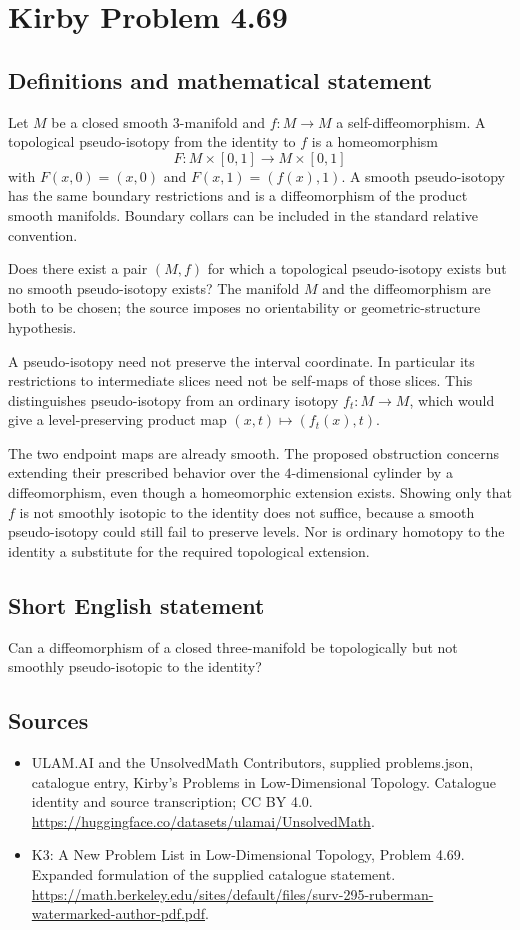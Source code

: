 \documentclass[11pt,a4paper]{article}
\begin{document}
\section*{Kirby Problem 4.69}\label{statement}

\subsection{Definitions and mathematical statement}
Let $M$ be a closed smooth $3$-manifold and $f:M\to M$ a
self-diffeomorphism. A topological pseudo-isotopy from the identity
to $f$ is a homeomorphism
\[
 F:M\times[0,1]\longrightarrow M\times[0,1]
\]
with $F(x,0)=(x,0)$ and $F(x,1)=(f(x),1)$.
A smooth pseudo-isotopy has the same boundary restrictions and is
a diffeomorphism of the product smooth manifolds. Boundary collars
can be included in the standard relative convention.

Does there exist a pair $(M,f)$ for which a topological
pseudo-isotopy exists but no smooth pseudo-isotopy exists? The
manifold $M$ and the diffeomorphism are both to be chosen; the
source imposes no orientability or geometric-structure hypothesis.

A pseudo-isotopy need not preserve the interval coordinate. In
particular its restrictions to intermediate slices need not be
self-maps of those slices. This distinguishes pseudo-isotopy from an
ordinary isotopy $f_t:M\to M$, which would give a level-preserving
product map $(x,t)\mapsto(f_t(x),t)$.

The two endpoint maps are already smooth. The proposed obstruction
concerns extending their prescribed behavior over the $4$-dimensional
cylinder by a diffeomorphism, even though a homeomorphic extension
exists. Showing only that $f$ is not smoothly isotopic to the
identity does not suffice, because a smooth pseudo-isotopy could
still fail to preserve levels. Nor is ordinary homotopy to the
identity a substitute for the required topological extension.
\subsection{Short English statement}
Can a diffeomorphism of a closed three-manifold be topologically but not smoothly pseudo-isotopic to the identity?
\subsection{Sources}
\begin{itemize}
\item[S1] ULAM.AI and the UnsolvedMath Contributors, supplied problems.json, catalogue entry, Kirby's Problems in Low-Dimensional Topology. Catalogue identity and source transcription; CC BY 4.0.
\url{https://huggingface.co/datasets/ulamai/UnsolvedMath}.
\item[S2] K3: A New Problem List in Low-Dimensional Topology, Problem 4.69. Expanded formulation of the supplied catalogue statement.
\url{https://math.berkeley.edu/sites/default/files/surv-295-ruberman-watermarked-author-pdf.pdf}.
\end{itemize}
\end{document}

